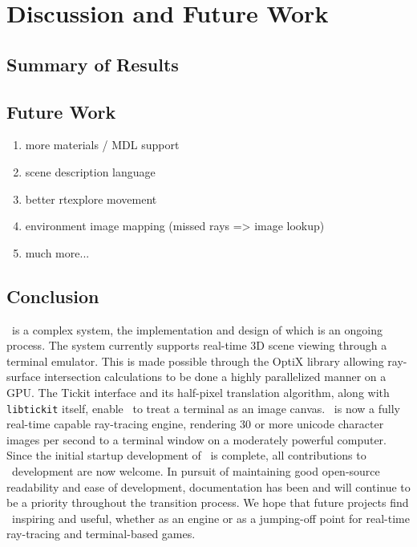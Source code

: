 %
%
%

\chapter{Discussion and Future Work}\label{ch:conclusion}

\section{Summary of Results}\label{ch:conclusion:summary}

\section{Future Work}\label{ch:conclusion:future}

\begin{enumerate}
  \item more materials / MDL support
  \item scene description language
  \item better rtexplore movement
  \item environment image mapping (missed rays => image lookup)
  \item much more...
\end{enumerate}

\section{Conclusion}\label{ch:conclusion:end}

\name\ is a complex system, the implementation and design of which is an ongoing process.
The system currently supports real-time 3D scene viewing through a terminal emulator.
This is made possible through the OptiX library allowing ray-surface intersection calculations to be done a highly parallelized manner on a GPU.
The Tickit interface and its half-pixel translation algorithm, along with \texttt{libtickit} itself, enable \name\ to treat a terminal as an image canvas.
\name\ is now a fully real-time capable ray-tracing engine, rendering 30 or more unicode character images per second to a terminal window on a moderately powerful computer.
Since the initial startup development of \name\ is complete, all contributions to \name\ development are now welcome.
In pursuit of maintaining good open-source readability and ease of development, documentation has been and will continue to be a priority throughout the transition process.
We hope that future projects find \name\ inspiring and useful, whether as an engine or as a jumping-off point for real-time ray-tracing and terminal-based games.
